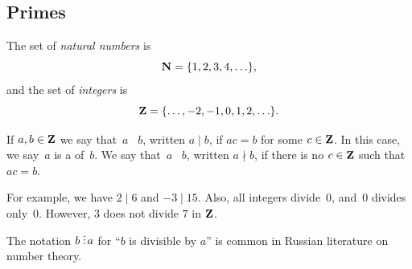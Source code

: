 \subsection{Primes}\label{sec:primes}
The set of {\em natural numbers} is
$$
  \mathbf{N} = \{1,2,3,4,\ldots\},
$$
and the set of {\em integers} is
$$
  \mathbf{Z} = \{\ldots, -2, -1, 0, 1,2,\ldots\}.
$$




\begin{definition}[Divides]
If $a, b\in \mathbf{Z}$ we say that~$a$
~$b$, written $a\mid b$, if $ac=b$ for some
$c\in \mathbf{Z}$.  In this case, we say~$a$ is a  of~$b$.  We say
that~$a$ ~$b$, written $a\nmid b$, if there is no
$c\in \mathbf{Z}$ such that $ac=b$.
\end{definition}
For example, we have $2 \mid 6$ and $-3\mid 15$.
Also, all integers divide~$0$, and~$0$ divides
only~$0$.  However, $3$ does not divide $7$ in $\mathbf{Z}$.

\begin{remark}
  The notation $b \overset{\displaystyle .}{:}\! a$ for ``$b$ is divisible by
  $a$'' is common in Russian literature on number theory.
\end{remark}



